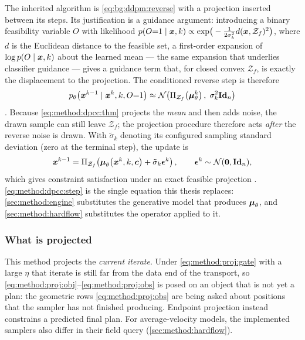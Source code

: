 The inherited algorithm is \eqref{eq:bg:ddpm:reverse} with a projection inserted between its
steps. Its justification is a guidance argument: introducing a binary feasibility variable
$O$ with likelihood
$p(O{=}1\mid\boldsymbol{x},k) \propto \exp\!\big(-\tfrac{1}{2\sigma_{k}^{2}}d(\boldsymbol{x},\mathcal{Z}_{f})^{2}\big)$,
where $d$ is the Euclidean distance to the feasible set, a first-order expansion of
$\log p(O\mid\boldsymbol{x},k)$ about the learned mean --- the same expansion that underlies classifier
guidance \parencite{dhariwal2021diffusion} --- gives a guidance term that, for closed convex
$\mathcal{Z}_{f}$, is exactly the displacement to the projection. The conditioned reverse step
is therefore
\begin{equation}\label{eq:method:dpcc:thm}
  p_{\theta}\!\left(\boldsymbol{x}^{k-1}\mid\boldsymbol{x}^{k},k,O{=}1\right)
  \approx \mathcal{N}\!\left(\Pi_{\mathcal{Z}_{f}}\!\left(\boldsymbol{\mu}_{\theta}^{k}\right),\;
    \sigma_{k}^{2}\textbf{Id}_{n}\right)
\end{equation}
\parencite[Theorem~1]{romer2025diffusion}. Because \eqref{eq:method:dpcc:thm} projects the
\emph{mean} and then adds noise, the drawn sample can still leave $\mathcal{Z}_{f}$; the
projection procedure therefore acts \emph{after} the reverse noise is drawn. With
$\tilde{\sigma}_k$ denoting its configured sampling standard deviation (zero at the terminal step),
the update is
\begin{equation}\label{eq:method:dpcc:step}
  \boldsymbol{x}^{k-1}
  = \Pi_{\mathcal{Z}_{f}}\!\left(
      \boldsymbol{\mu}_{\theta}\!\left(\boldsymbol{x}^{k},k,\boldsymbol{c}\right) + \tilde{\sigma}_{k}\boldsymbol{\epsilon}^{k}
    \right),
  \qquad \boldsymbol{\epsilon}^{k}\sim\mathcal{N}(\boldsymbol{0},\textbf{Id}_{n}),
\end{equation}
which gives constraint satisfaction under an exact feasible projection
\parencite[Eq.~16]{romer2025diffusion}. \eqref{eq:method:dpcc:step} is the single equation this
thesis replaces: \autoref{sec:method:engine} substitutes the generative model that produces
$\boldsymbol{\mu}_{\theta}$, and \autoref{sec:method:hardflow} substitutes the operator applied to it.

\subsubsection*{What is projected}

This method projects the \emph{current iterate}. Under \eqref{eq:method:proj:gate} with a large $\eta$
that iterate is still far from the data end of the transport, so
\eqref{eq:method:proj:obj}--\eqref{eq:method:proj:obs} is posed on an object that is not yet a
plan: the geometric rows \eqref{eq:method:proj:obs} are being asked about positions that the
sampler has not finished producing. Endpoint projection instead constrains a predicted final plan. For average-velocity models, the
implemented samplers also differ in their field query (\autoref{sec:method:hardflow}).

